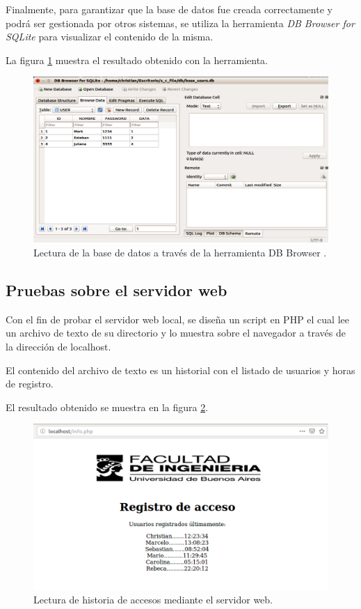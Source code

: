 Finalmente, para garantizar que la base de datos fue creada correctamente y podrá ser gestionada por otros sistemas, se utiliza la herramienta \textit{DB Browser for SQLite} para visualizar el contenido de la misma.

La figura \ref{fig:browser} muestra el resultado obtenido con la herramienta.

\begin{figure}[H]
	\centering
	\includegraphics[scale=.3]{./Figures/browser.png}
	\caption{Lectura de la base de datos a través de la herramienta DB Browser .}
	\label{fig:browser}
\end{figure}


\subsection{Pruebas sobre el servidor web}

Con el fin de probar el servidor web local, se diseña un script en PHP el cual lee un archivo de texto de su directorio y lo muestra sobre el navegador a través de la dirección de localhost.

El contenido del archivo de texto es un historial con el listado de usuarios y horas de registro.

El resultado obtenido se muestra en la figura \ref{fig:web}.

\begin{figure}[h]
	\centering
	\includegraphics[scale=.25]{./Figures/web.png}
	\caption{Lectura de historia de accesos mediante el servidor web.}
	\label{fig:web}
\end{figure}

